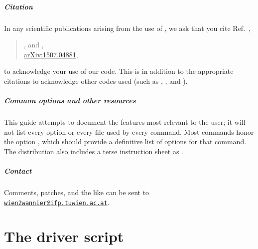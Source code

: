 \paragraph{Citation} In any scientific publications arising from the
use of \woptic, we ask that you cite Ref.~\cite{woptic},
%
\begin{quote}
  , and
  ,\\
  \href{http://arxiv.org/abs/1507.04881}{arXiv:1507.04881},
\end{quote}
%
to acknowledge your use of our code.  This is in addition to the
appropriate citations to acknowledge other codes used (such as \wien
\cite{wien2k}, \wannier \cite{wien2wannier}, and \wtow
\cite{wannier90}).

\paragraph{Common options and other resources} This guide attempts to
document the features most relevant to the \woptic user; it will not
list every option or every file used by every command.  Most commands
honor the option , which should provide a definitive
list of options for that command.  The \woptic distribution also
includes a terse instruction sheet as .

\paragraph{Contact} Comments, patches, and the like can be sent to
\texttt{\href{mailto:wien2wannier@ifp.tuwien.ac.at}
  {wien2wannier@ifp.tuwien.ac.at}}.

\MyTOC

\mainmatter


\chapter{The driver script \woprogHd}
\label{sec:woprog}


